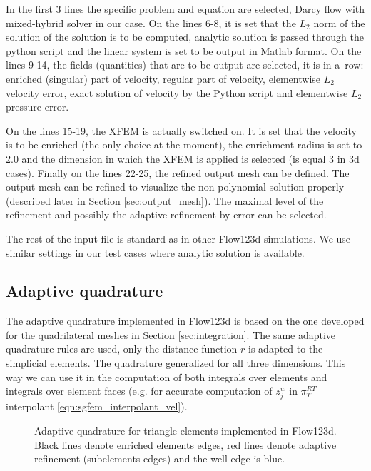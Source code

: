 % 
In the first 3 lines the specific problem and equation are selected,
Darcy flow with mixed-hybrid solver in our case. On the lines 6-8, it is set that the $L_2$ norm of the solution of the solution is to be computed,
analytic solution is passed through the python script and the linear system is set to be output in Matlab format.
On the lines 9-14, the fields (quantities) that are to be output are selected, it is in a~row: enriched (singular) part of velocity,
regular part of velocity, elementwise $L_2$ velocity error, exact solution of velocity by the Python script and elementwise $L_2$ pressure error.

On the lines 15-19, the XFEM is actually switched on. It is set that the velocity is to be enriched (the only choice at the moment),
the enrichment radius is set to 2.0 and the dimension in which the XFEM is applied is selected (is equal 3 in 3d cases).
Finally on the lines 22-25, the refined output mesh can be defined. The output mesh can be refined to visualize the non-polynomial solution properly
(described later in Section \ref{sec:output_mesh}). The maximal level of the refinement and possibly the adaptive refinement by error can be selected.

The rest of the input file is standard as in other Flow123d simulations.
We use similar settings in our test cases where analytic solution is available.




\subsection{Adaptive quadrature}
The adaptive quadrature implemented in Flow123d is based on the one developed for the quadrilateral meshes
in Section \ref{sec:integration}. The same adaptive quadrature rules are used, only the distance function $r$
is adapted to the simplicial elements. The quadrature generalized for all three dimensions.
This way we can use it in the computation of both integrals over elements and integrals
over element faces (e.g. for accurate computation of $z^w_j$ in $\pi^{RT}_T$ interpolant \eqref{eqn:sgfem_interpolant_vel}).

\begin{figure}[!htb]
  \centering    
  \hspace{0pt}
  \caption[Adaptive quadrature in Flow123d.]
  {Adaptive quadrature for triangle elements implemented in Flow123d.
   Black lines denote enriched elements edges, red lines denote adaptive refinement (subelements edges) and the well
   edge is blue.
  }
  \label{fig:adapt_refinement_flow123d}
\end{figure}

